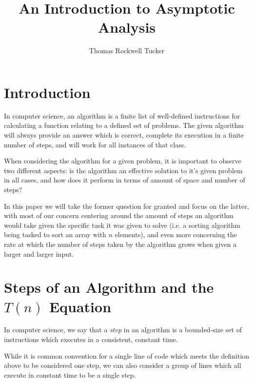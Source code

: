 \documentclass{article}
\title{An Introduction to Asymptotic Analysis}
\author{Thomas Rockwell Tucker}\date{}
\begin{document}
 \maketitle

 \section*{Introduction} %

 In computer science, an algorithm is a finite list of well-defined instructions for calculating a function relating to a defined set of problems. The given algorithm will always provide an answer which is correct, complete its execution in a finite number of steps, and will work for all instances of that class.\cite{mcquain11}

 When considering the algorithm for a given problem, it is important to observe two different aspects: is the algorithm an effective solution to it's given problem in all cases, and how does it perform in terms of amount of space and number of steps?

 In this paper we will take the former question for granted and focus on the latter, with most of our concern centering around the amount of steps an algorithm would take given the specific task it was given to solve (i.e. a sorting algorithm being tasked to sort an array with $n$ elements), and even more concerning the rate at which the number of steps taken by the algorithm grows when given a larger and larger input.



 \section{Steps of an Algorithm and the $T(n)$ Equation} %

 \begin{definition}\label{def:step}
  In computer science, we say that a \emph{step} in an algorithm is a bounded-size set of instructions which executes in a consistent, constant time.\cite{roughgarden22}
 \end{definition}
 \begin{remark}\label{rem:step}
  While it is common convention for a single line of code which meets the definition above to be considered one step, we can also consider a group of lines which all execute in constant time to be a single step.
 \end{remark}
\end{document}
